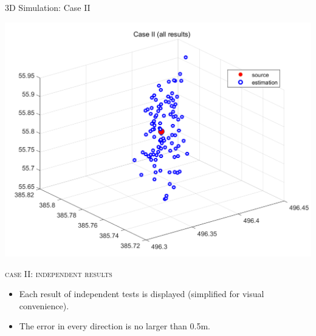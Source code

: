 \documentclass[10pt]{beamer}
\begin{document}
\begin{frame}{3D Simulation: Case II}
  \begin{center}
  \includegraphics[scale = 0.2]{img/case2result_all.png}
  \end{center}
  \begin{center} \textsc{case II: independent results} \end{center}
  \begin{itemize}
    \item \small Each result of independent tests is displayed (simplified for visual convenience).
    \item \small The error in every direction is no larger than 0.5m.
  \end{itemize}
\end{frame}
\end{document}
